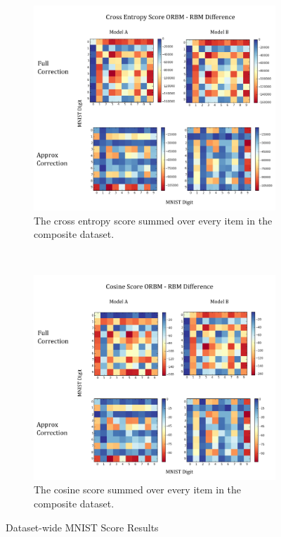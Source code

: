     \begin{figure}[h]
    \centering
    \begin{subfigure}[t]{0.45\textwidth}
        \includegraphics[width=\textwidth]{Assets/Cross-Entropy-Score.png}
        \caption{The cross entropy score summed over every item in the composite dataset.}
        \label{F:Cross-Entropy-MNIST}
    \end{subfigure}
    ~ %
    \begin{subfigure}[t]{0.45\textwidth}
        \includegraphics[width=\textwidth]{Assets/Cosine-Score.png}
        \caption{The cosine score summed over every item in the composite dataset.}
        \label{F:Cosine-MNIST}
    \end{subfigure}
    \caption{Dataset-wide MNIST Score Results }\label{fig:mnist-dataset-wide-results}
\end{figure}

